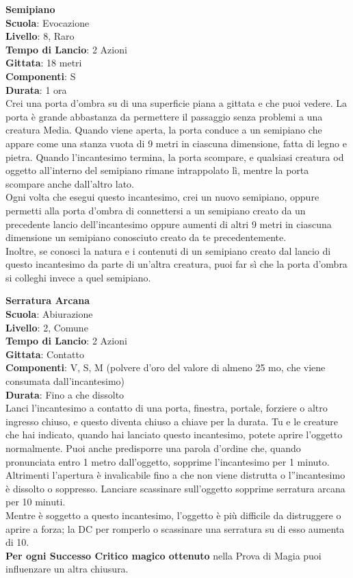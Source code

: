 \begin{multicols}{2}
\medskip\textbf{Semipiano}\\
\textbf{Scuola}: Evocazione\\
\textbf{Livello}: 8, Raro\\
\textbf{Tempo di Lancio}: 2 Azioni\\
\textbf{Gittata}: 18 metri\\
\textbf{Componenti}: S\\
\textbf{Durata}: 1 ora\\
Crei una porta d'ombra su di una superficie piana a gittata e che puoi vedere. La porta è grande abbastanza da permettere il passaggio senza problemi a una creatura Media. Quando viene aperta, la porta conduce a un semipiano che appare come una stanza vuota di 9 metri in ciascuna dimensione, fatta di legno e pietra. Quando l'incantesimo termina, la porta scompare, e qualsiasi creatura od oggetto all'interno del semipiano rimane intrappolato lì, mentre la porta scompare anche dall'altro lato.\\
Ogni volta che esegui questo incantesimo, crei un nuovo semipiano, oppure permetti alla porta d'ombra di connettersi a un semipiano creato da un precedente lancio dell'incantesimo oppure aumenti di altri 9 metri in ciascuna dimensione un semipiano conosciuto creato da te precedentemente. \\
Inoltre, se conosci la natura e i contenuti di un semipiano creato dal lancio di questo incantesimo da parte di un'altra creatura, puoi far sì che la porta d'ombra si colleghi invece a quel semipiano.

\medskip\textbf{Serratura Arcana}\\
\textbf{Scuola}: Abiurazione\\
\textbf{Livello}: 2, Comune\\
\textbf{Tempo di Lancio}: 2 Azioni\\
\textbf{Gittata}: Contatto\\
\textbf{Componenti}: V, S, M (polvere d'oro del valore di almeno 25 mo, che viene consumata dall'incantesimo) \\
\textbf{Durata}: Fino a che dissolto\\
Lanci l'incantesimo a contatto di una porta, finestra, portale, forziere o altro ingresso chiuso, e questo diventa chiuso a chiave per la durata. Tu e le creature che hai indicato, quando hai lanciato questo incantesimo, potete aprire l'oggetto normalmente. Puoi anche predisporre una parola d'ordine che, quando pronunciata entro 1 metro dall'oggetto, sopprime l'incantesimo per 1 minuto. Altrimenti l'apertura è invalicabile fino a che non viene distrutta o l''incantesimo è dissolto o soppresso. Lanciare scassinare sull'oggetto sopprime serratura arcana per 10 minuti.\\
Mentre è soggetto a questo incantesimo, l'oggetto è più difficile da distruggere o aprire a forza; la DC per romperlo o scassinare una serratura su di esso aumenta di 10.\\
\textbf{Per ogni Successo Critico magico ottenuto} nella Prova di Magia puoi influenzare un altra chiusura.


\end{multicols}
